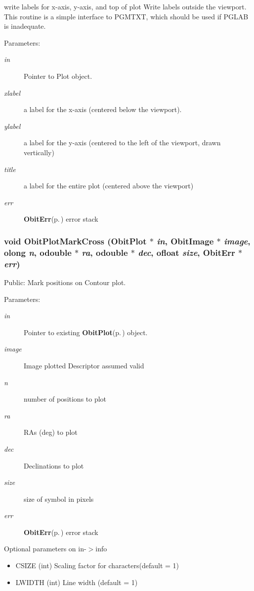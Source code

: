 write labels for x-axis, y-axis, and top of plot Write labels outside the viewport. This routine is a simple interface to PGMTXT, which should be used if PGLAB is inadequate. \begin{Desc}
\item[Parameters:]
\begin{description}
\item[{\em in}]Pointer to Plot object. \item[{\em xlabel}]a label for the x-axis (centered below the viewport). \item[{\em ylabel}]a label for the y-axis (centered to the left of the viewport, drawn vertically) \item[{\em title}]a label for the entire plot (centered above the viewport) \item[{\em err}]{\bf Obit\-Err}{\rm (p.\,\pageref{structObitErr})} error stack \end{description}
\end{Desc}
\subsubsection{\setlength{\rightskip}{0pt plus 5cm}void Obit\-Plot\-Mark\-Cross ({\bf Obit\-Plot} $\ast$ {\em in}, {\bf Obit\-Image} $\ast$ {\em image}, {\bf olong} {\em n}, {\bf odouble} $\ast$ {\em ra}, {\bf odouble} $\ast$ {\em dec}, {\bf ofloat} {\em size}, {\bf Obit\-Err} $\ast$ {\em err})}\label{ObitPlot_8h_a14}


Public: Mark positions on Contour plot. 

\begin{Desc}
\item[Parameters:]
\begin{description}
\item[{\em in}]Pointer to existing {\bf Obit\-Plot}{\rm (p.\,\pageref{structObitPlot})} object. \item[{\em image}]Image plotted Descriptor assumed valid \item[{\em n}]number of positions to plot \item[{\em ra}]RAs (deg) to plot \item[{\em dec}]Declinations to plot \item[{\em size}]size of symbol in pixels \item[{\em err}]{\bf Obit\-Err}{\rm (p.\,\pageref{structObitErr})} error stack\end{description}
\end{Desc}
Optional parameters on in-$>$info \begin{itemize}
\item CSIZE (int) Scaling factor for characters(default = 1) \item LWIDTH (int) Line width (default = 1) \end{itemize}
